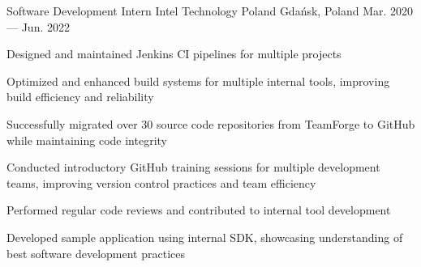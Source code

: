\begin{cventries}
    \cventry
    {Software Development Intern} %
    {Intel Technology Poland} %
    {Gdańsk, Poland} %
    {Mar. 2020 --- Jun. 2022} %
    {
        \begin{cvitems} %
        \item Designed and maintained Jenkins CI pipelines for multiple projects
        \item Optimized and enhanced build systems for multiple internal tools, improving build efficiency and reliability
        \item Successfully migrated over 30 source code repositories from TeamForge to GitHub while maintaining code integrity
        \item Conducted introductory GitHub training sessions for multiple development teams, improving version control practices and team efficiency
        \item Performed regular code reviews and contributed to internal tool development
        \item Developed sample application using internal SDK, showcasing understanding of best software development practices
        \end{cvitems}
    }

\end{cventries}
